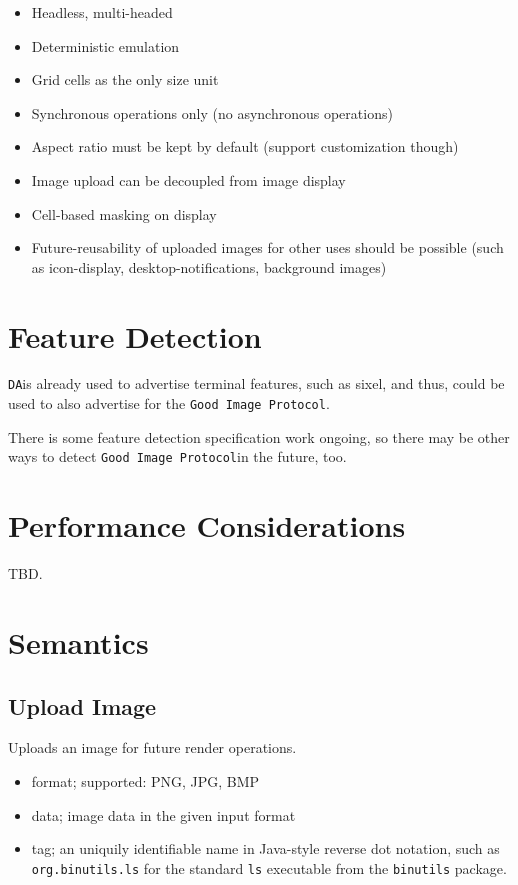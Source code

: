 \documentclass{article}
\newcommand{\code}[1]{\colorbox{light-gray}{\texttt{#1}}}
\newcommand{\DA}{\code{DA}}                          %
\newcommand{\GoodImageProtocol}{\code{Good Image Protocol}}
\begin{document}
\begin{itemize}
    \item Headless, multi-headed
    \item Deterministic emulation
    \item Grid cells as the only size unit
    \item Synchronous operations only (no asynchronous operations)
    \item Aspect ratio must be kept by default (support customization though)
    \item Image upload can be decoupled from image display
    \item Cell-based masking on display
    \item Future-reusability of uploaded images for other uses should be possible (such as
        icon-display, desktop-notifications, background images)
\end{itemize}

\section{Feature Detection}

\DA is already used to advertise terminal features, such as sixel, and thus, could be used
to also advertise for the \GoodImageProtocol.

There is some feature detection specification work ongoing, so there may be other ways to detect
\GoodImageProtocol in the future, too.

\section{Performance Considerations}

TBD.

\section{Semantics}

\subsection{Upload Image}

Uploads an image for future render operations.

\begin{itemize}
    \item format; supported: PNG, JPG, BMP
    \item data; image data in the given input format
    \item tag; an uniquily identifiable name in Java-style reverse dot notation, such as
        \code{org.binutils.ls} for the standard \code{ls} executable from the \code{binutils} package.
\end{itemize}
\end{document}
